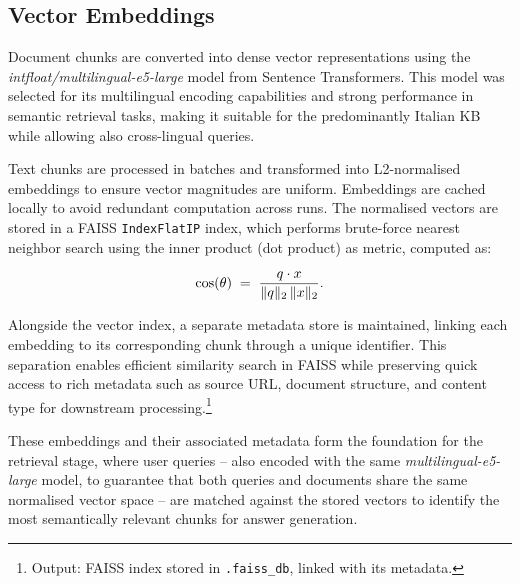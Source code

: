\begin{spacing}{1.5}
\sloppy
\subsection{Vector Embeddings}
Document chunks are converted into dense vector representations using the \textit{intfloat/multilingual-e5-large} model from Sentence Transformers. This model was selected for its multilingual encoding capabilities and strong performance in semantic retrieval tasks, making it suitable for the predominantly Italian KB while allowing also cross-lingual queries. 

Text chunks are processed in batches and transformed into L2-normalised embeddings to ensure vector magnitudes are uniform. Embeddings are cached locally to avoid redundant computation across runs. The normalised vectors are stored in a FAISS \texttt{IndexFlatIP} index, which performs brute-force nearest neighbor search using the inner product (dot product) as metric, computed as:

\[
\cos(\theta) \;=\; \frac{q \cdot x}{\|q\|_2 \, \|x\|_2}.\\
\]

Alongside the vector index, a separate metadata store is maintained, linking each embedding to its corresponding chunk through a unique identifier. This separation enables efficient similarity search in FAISS while preserving quick access to rich metadata such as source URL, document structure, and content type for downstream processing.\footnote{Output: FAISS index stored in \texttt{.faiss\_db}, linked with its metadata.}

These embeddings and their associated metadata form the foundation for the retrieval stage, where user queries -- also encoded with the same \textit{multilingual-e5-large} model, to guarantee that both queries and documents share the same normalised vector space -- are matched against the stored vectors to identify the most semantically relevant chunks for answer generation.


\end{spacing}
